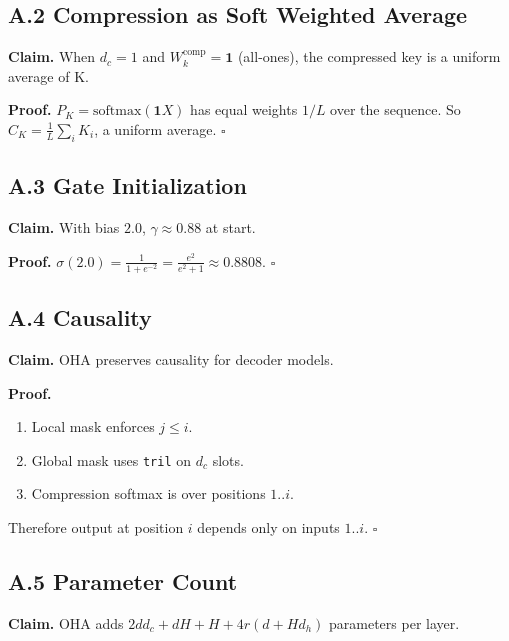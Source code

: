 \subsection{A.2 Compression as Soft Weighted Average}

\textbf{Claim.} When $d_c = 1$ and $W_k^\text{comp} = \mathbf{1}$ (all-ones), the 
compressed key is a uniform average of K.

\textbf{Proof.} $P_K = \text{softmax}(\mathbf{1} X)$ has equal weights $1/L$ over 
the sequence. So $C_K = \frac{1}{L} \sum_i K_i$, a uniform average. $\square$

\subsection{A.3 Gate Initialization}

\textbf{Claim.} With bias $2.0$, $\gamma \approx 0.88$ at start.

\textbf{Proof.} $\sigma(2.0) = \frac{1}{1 + e^{-2}} = \frac{e^2}{e^2 + 1} \approx 0.8808$. $\square$

\subsection{A.4 Causality}

\textbf{Claim.} OHA preserves causality for decoder models.

\textbf{Proof.} 
\begin{enumerate}
\item Local mask enforces $j \leq i$.
\item Global mask uses \texttt{tril} on $d_c$ slots.
\item Compression softmax is over positions $1..i$.

\end{enumerate}
Therefore output at position $i$ depends only on inputs $1..i$. $\square$

\subsection{A.5 Parameter Count}

\textbf{Claim.} OHA adds $2 d d_c + d H + H + 4 r(d + H d_h)$ parameters per layer.

